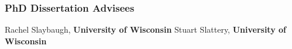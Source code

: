 \vspace*{-2ex}
\subsubsection*{PhD Dissertation Advisees}
\vspace{-1ex}
Rachel Slaybaugh, {\bf University of Wisconsin}
Stuart Slattery, {\bf University of Wisconsin}

\pagebreak
\endinput


